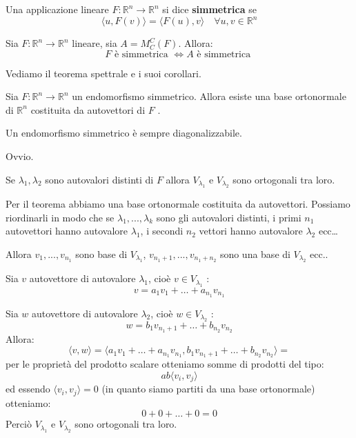 \documentclass[
  a4paper,
]{article}
\begin{document}
\begin{definitionbox}
Una applicazione lineare \(F: \mathbb{R}^n \to \mathbb{R}^n\) si dice
\textbf{simmetrica} se \[
\langle u, F(v) \rangle = \langle F(u), v \rangle \quad \forall u, v \in \mathbb{R}^n
\]
\end{definitionbox}

\begin{propositionbox}
Sia \(F: \mathbb{R}^n \to \mathbb{R}^n\) lineare, sia \(A = M_C^C(F)\).
Allora: \[
F \text{ è simmetrica } \iff A \text { è simmetrica }
\]
\end{propositionbox}

Vediamo il teorema spettrale e i suoi corollari.

\begin{teoremabox}
Sia \(F: \mathbb{R}^n \to \mathbb{R}^n\) un endomorfismo simmetrico.
Allora esiste una base ortonormale di \(\mathbb{R}^n\) costituita da
autovettori di \(F\) .
\end{teoremabox}

\begin{propositionbox}[Corollario]
Un endomorfismo simmetrico è sempre diagonalizzabile.
\end{propositionbox}

\begin{proofbox}
Ovvio.
\end{proofbox}

\begin{propositionbox}[Corollario]
Se \(\lambda_1, \lambda_2\) sono autovalori distinti di \(F\) allora
\(V_{\lambda_1}\) e \(V_{\lambda_2}\) sono ortogonali tra loro.
\end{propositionbox}

\begin{proofbox}
Per il teorema abbiamo una base ortonormale costituita da autovettori.
Possiamo riordinarli in modo che se \(\lambda_1, ..., \lambda_k\) sono
gli autovalori distinti, i primi \(n_1\) autovettori hanno autovalore
\(\lambda_1\), i secondi \(n_2\) vettori hanno autovalore \(\lambda_2\)
ecc\ldots{}

Allora \(v_1,..., v_{n_1}\) sono base di \(V_{\lambda_1}\),
\(v_{n_1 + 1}, ..., v_{n_1 + n_2}\) sono una base di \(V_{\lambda_2}\)
ecc..

Sia \(v\) autovettore di autovalore \(\lambda_1\), cioè
\(v \in V_{\lambda_1}\) : \[
v = a_1v_1 + \dots + a_{n_1} v_{n_1}
\]

Sia \(w\) autovettore di autovalore \(\lambda_2\), cioè
\(w \in V_{\lambda_2}\) : \[
w = b_1 v_{n_1 + 1} + \dots + b_{n_2} v_{n_2}
\] Allora: \[
\langle v, w \rangle = \langle  a_1v_1 + \dots + a_{n_1} v_{n_1} , b_1 v_{n_1 + 1} + \dots + b_{n_2} v_{n_2}\rangle =
\] per le proprietà del prodotto scalare otteniamo somme di prodotti del
tipo: \[
ab \langle v_i , v_j \rangle
\] ed essendo \(\langle v_i , v_j \rangle = 0\) (in quanto siamo partiti
da una base ortonormale) otteniamo: \[
0 + 0 + \dots + 0 = 0
\] Perciò \(V_{\lambda_1}\) e \(V_{\lambda_2}\) sono ortogonali tra
loro.
\end{proofbox}
\end{document}
